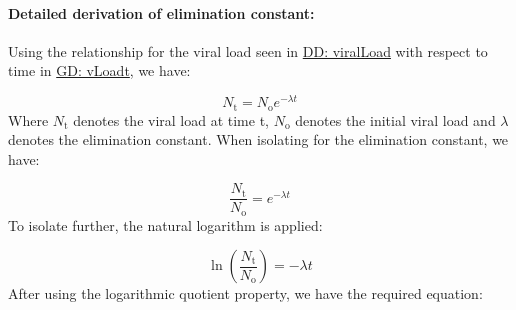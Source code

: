 \documentclass[12pt]{article}
\begin{document}
\paragraph{Detailed derivation of elimination constant:}
\label{IM:calofElimConstDeriv}
Using the relationship for the viral load seen in \hyperref[DD:viralLoad]{DD: viralLoad} with respect to time in \hyperref[GD:vLoadt]{GD: vLoadt}, we have:

\begin{displaymath}
{N_{\text{t}}}={N_{\text{o}}} e^{-λ t}
\end{displaymath}
Where ${N_{\text{t}}}$ denotes the viral load at time t, ${N_{\text{o}}}$ denotes the initial viral load and $λ$ denotes the elimination constant. When isolating for the elimination constant,  we have:

\begin{displaymath}
\frac{{N_{\text{t}}}}{{N_{\text{o}}}}=e^{-λ t}
\end{displaymath}
To isolate further, the natural logarithm is applied:

\begin{displaymath}
\ln\left(\frac{{N_{\text{t}}}}{{N_{\text{o}}}}\right)=-λ t
\end{displaymath}
After using the logarithmic quotient property, we have the required equation:
\end{document}
